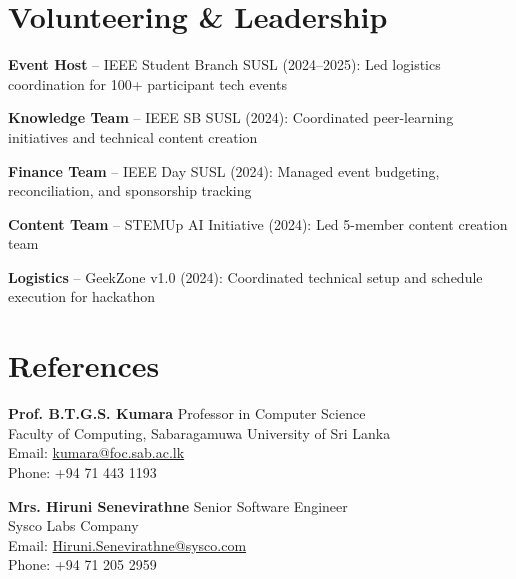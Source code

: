 \documentclass[letterpaper,10.8pt]{article}
\newenvironment{resume_list}{
  \vspace{-1pt}
  \begin{itemize}[itemsep=2pt, leftmargin=14pt]
}{
  \end{itemize}\vspace{-2pt}
}
\begin{document}
\section{Volunteering \& Leadership}
\vspace{-1pt}
\begin{resume_list}
  \item \textbf{Event Host} – IEEE Student Branch SUSL (2024–2025): Led logistics coordination for 100+ participant tech events
  \vspace{3pt}
  \item \textbf{Knowledge Team} – IEEE SB SUSL (2024): Coordinated peer-learning initiatives and technical content creation
  \vspace{3pt}
  \item \textbf{Finance Team} – IEEE Day SUSL (2024): Managed event budgeting, reconciliation, and sponsorship tracking
  \vspace{3pt}
  \item \textbf{Content Team} – STEMUp AI Initiative (2024): Led 5-member content creation team
  \vspace{3pt}
  \item \textbf{Logistics} – GeekZone v1.0 (2024): Coordinated technical setup and schedule execution for hackathon
\end{resume_list}

\vspace{-2pt}
\section{References}
\vspace{-1pt}

\noindent\textbf{Prof. B.T.G.S. Kumara} \hfill Professor in Computer Science\\
Faculty of Computing, Sabaragamuwa University of Sri Lanka\\
Email: \href{mailto:kumara@foc.sab.ac.lk}{kumara@foc.sab.ac.lk}\\
Phone: +94 71 443 1193

\vspace{8pt}
\noindent\textbf{Mrs. Hiruni Senevirathne} \hfill Senior Software Engineer\\
Sysco Labs Company\\
Email: \href{mailto:Hiruni.Senevirathne@sysco.com}{Hiruni.Senevirathne@sysco.com}\\
Phone: +94 71 205 2959
\end{document}
